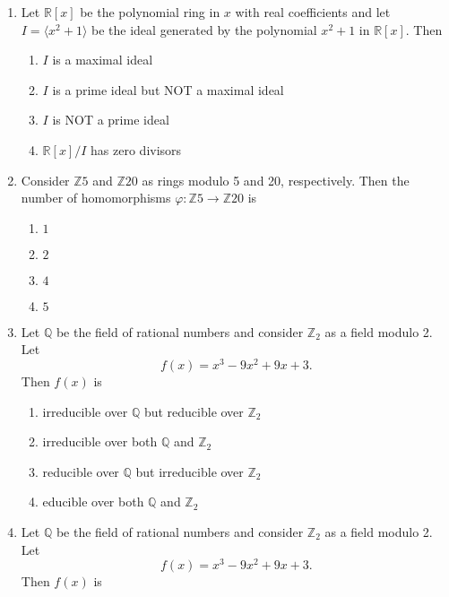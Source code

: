 \documentclass[journal]{IEEEtran}
\numberwithin{equation}{enumi}
\numberwithin{figure}{enumi}
\begin{document}
\begin{enumerate}
\item Let $\mathbb{R}[x]$ be the polynomial ring in $x$ with real coefficients and let $I = \langle x^2 + 1 \rangle$ be the ideal generated by the polynomial $x^2 + 1$ in $\mathbb{R}[x]$. Then        \hfill{}
\begin{enumerate}
   
\item $I$ is a maximal ideal\\
\item  $I$ is a prime ideal but NOT a maximal ideal\\
\item $I$ is NOT a prime ideal\\
\item  $\mathbb{R}[x]/I$ has zero divisors
\end{enumerate}



    

\item Consider $\mathbb{Z}5$ and $\mathbb{Z}{20}$ as rings modulo 5 and 20, respectively. Then the number of homomorphisms $\varphi: \mathbb{Z}5 \to \mathbb{Z}{20}$ is
\hfill{}
\begin{multicols}{4}
\begin{enumerate}
    \item $1$
    \item $2$
    \item $4$
    \item $5$
\end{enumerate}
\end{multicols}


\item Let $\mathbb{Q}$ be the field of rational numbers and consider $\mathbb{Z}_2$ as a field modulo 2. Let
    \[
    f(x) = x^3 - 9x^2 + 9x + 3.
    \]
    Then $f(x)$ is
  \hfill{} 
\begin{enumerate}   
  \item irreducible over $\mathbb{Q}$ but reducible over $\mathbb{Z}_2$
  \item irreducible over both $\mathbb{Q}$ and $\mathbb{Z}_2$
  \item reducible over $\mathbb{Q}$ but irreducible over $\mathbb{Z}_2$
  \item educible over both $\mathbb{Q}$ and $\mathbb{Z}_2$
 \end{enumerate}




\item Let $\mathbb{Q}$ be the field of rational numbers and consider $\mathbb{Z}_2$ as a field modulo 2. Let
    \[
    f(x) = x^3 - 9x^2 + 9x + 3.
    \]
    Then $f(x)$ is
   \hfill{}  
    \begin{enumerate}
        

\end{enumerate}
\end{enumerate}
\end{document}
